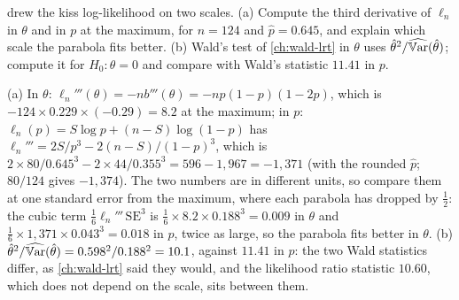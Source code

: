 \begin{exercise}
\label{ex:ef-concave-p}
 drew the kiss log-likelihood on two scales. (a) Compute the third derivative of $\ell_n$ in $\theta$ and in $p$ at the maximum, for $n = 124$ and $\hat{p} = 0.645$, and explain which scale the parabola fits better. (b) Wald's test of \cref{ch:wald-lrt} in $\theta$ uses $\hat{\theta}^2/\widehat{\operatorname*{\mathbb{V}\text{ar}}}(\hat{\theta})$; compute it for $H_0: \theta = 0$ and compare with Wald's statistic $11.41$ in $p$.
\end{exercise}
\begin{solution}
(a) In $\theta$: $\ell_n'''(\theta) = -nb'''(\theta) = -np(1 - p)(1 - 2p)$, which is $-124 \times 0.229 \times (-0.29) = 8.2$ at the maximum; in $p$: $\ell_n(p) = S\log p + (n - S)\log(1 - p)$ has $\ell_n''' = 2S/p^3 - 2(n - S)/(1 - p)^3$, which is $2 \times 80/0.645^3 - 2 \times 44/0.355^3 = 596 - 1{,}967 = -1{,}371$ (with the rounded $\hat{p}$; $80/124$ gives $-1{,}374$). The two numbers are in different units, so compare them at one standard error from the maximum, where each parabola has dropped by $\frac12$: the cubic term $\frac16\ell_n'''\,\mathrm{SE}^3$ is $\frac16 \times 8.2 \times 0.188^3 = 0.009$ in $\theta$ and $\frac16 \times 1{,}371 \times 0.043^3 = 0.018$ in $p$, twice as large, so the parabola fits better in $\theta$. (b) $\hat{\theta}^2/\widehat{\operatorname*{\mathbb{V}\text{ar}}}(\hat{\theta}) = 0.598^2/0.188^2 = 10.1$, against $11.41$ in $p$: the two Wald statistics differ, as \cref{ch:wald-lrt} said they would, and the likelihood ratio statistic $10.60$, which does not depend on the scale, sits between them.
\end{solution}
